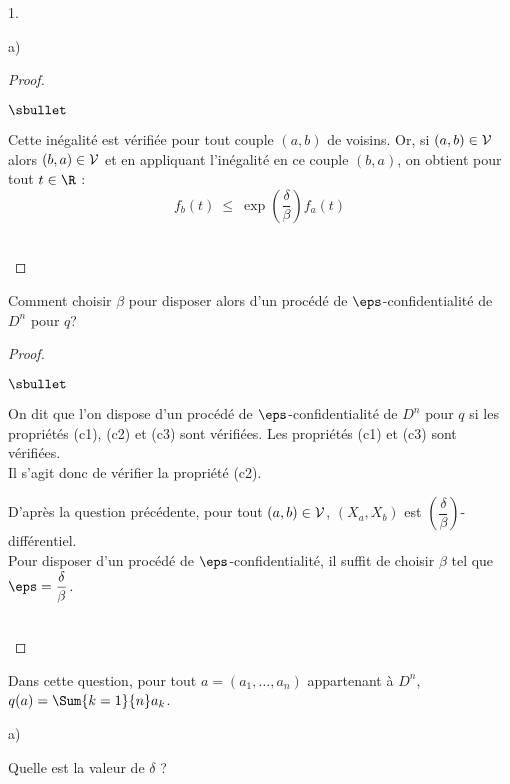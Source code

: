\begin{noliste}{1.}
\begin{noliste}{a)}
\begin{proof}
\begin{noliste}{$\sbullet$}
      \item Cette inégalité est vérifiée pour tout couple $(a, b)$ de
        voisins. Or, si $(a, b) \in {\cal V}$ alors $(b, a) \in {\cal
          V}$ et en appliquant l'inégalité en ce couple $(b, a)$, on
        obtient pour tout $t \in \R$ :
        \[
        f_b(t) \ \leq \ \exp\left(\dfrac{\delta}{\beta}\right) f_a(t)
        \]
      \end{noliste}
      ~\\[-1cm]
    \end{proof}
  
  \item Comment choisir $\beta$ pour disposer alors d'un procédé de
    $\eps$-confidentialité de $D^n$ pour $q$?

    \begin{proof}~%
      \begin{noliste}{$\sbullet$}
      \item On dit que l'on dispose d'un procédé de
        $\eps$-confidentialité de $D^n$ pour $q$ si les propriétés
        (c1), (c2) et (c3) sont vérifiées. Les propriétés (c1) et (c3)
        sont vérifiées.\\
        Il s'agit donc de vérifier la propriété (c2).

      \item D'après la question précédente, pour tout $(a, b) \in
        {\cal V}$, $(X_a, X_b)$ est $\left( \dfrac{\delta}{\beta}
        \right)$-différentiel.\\
        Pour disposer d'un procédé de $\eps$-confidentialité, il
        suffit de choisir $\beta$ tel que $\eps =
        \dfrac{\delta}{\beta}$.
      \end{noliste}
      ~\\[-1cm]
    \end{proof}
  \end{noliste}

\item Dans cette question, pour tout $a = (a_1, \ldots ,a_n)$
  appartenant à $D^n$, $q(a) = \Sum{k=1}{n} a_k$.
  \begin{noliste}{a)}
    \setlength{\itemsep}{2mm} %
  \item Quelle est la valeur de $\delta$ ?


\end{noliste}
\end{noliste}

